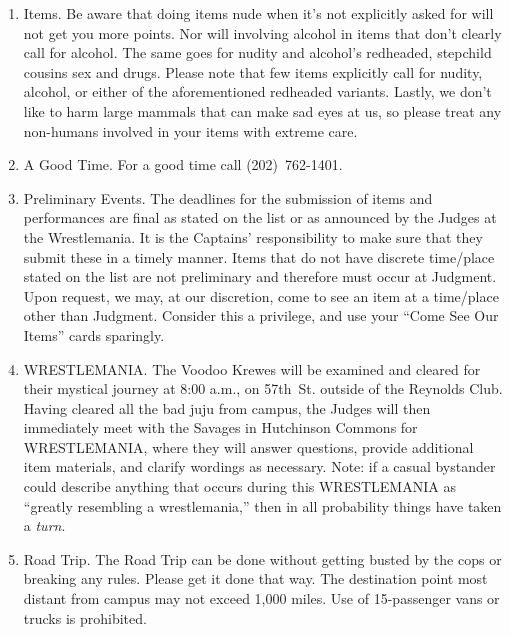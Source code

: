 \documentclass{book}
\begin{document}
\begin{enumerate}
\item Items. Be aware that doing items nude when it's not explicitly asked for will not get you more points. Nor will involving alcohol in items that don't clearly call for alcohol. The same goes for nudity and alcohol's redheaded, stepchild cousins sex and drugs.  Please note that few items explicitly call for nudity, alcohol, or either of the aforementioned redheaded variants. Lastly, we don't like to harm large mammals that can make sad eyes at us, so please treat any non-humans involved in your items with extreme care.

\item  A Good Time.  For a good time call (202)~762-1401.

\item Preliminary Events. The deadlines for the submission of items and performances are final as stated on the list or as announced by the Judges at the Wrestlemania. It is the Captains' responsibility to make sure that they submit these in a timely manner. Items that do not have discrete time/place stated on the list are not preliminary and therefore must occur at Judgment. Upon request, we may, at our discretion, come to see an item at a time/place other than Judgment.  Consider this a privilege, and use your ``Come See Our Items'' cards sparingly.

\item WRESTLEMANIA. The Voodoo Krewes will be examined and cleared for their mystical journey at 8:00 a.m., on 57th\ St. outside of the Reynolds Club. Having cleared all the bad juju from campus, the Judges will then immediately meet with the Savages in Hutchinson Commons for WRESTLEMANIA, where they will answer questions, provide additional item materials, and clarify wordings as necessary. Note: if a casual bystander could describe anything that occurs during this WRESTLEMANIA as ``greatly resembling a wrestlemania,'' then in all probability things have taken a \emph{turn}.

\item Road Trip. The Road Trip can be done without getting busted by the cops or breaking any rules.  Please get it done that way. The destination point most distant from campus may not exceed 1,000 miles.  Use of 15-passenger vans or trucks is prohibited.


\end{enumerate}
\end{document}
